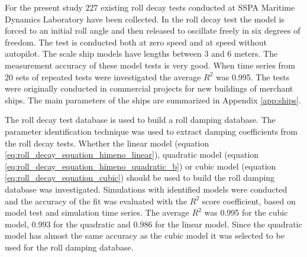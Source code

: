 For the present study 227 existing roll decay tests conducted at SSPA Maritime Dynamics Laboratory have been collected. In the roll decay test the model is forced to an initial roll angle and then released to oscillate freely in six degrees of freedom. The test is conducted both at zero speed and at speed without autopilot. The scale ship models have lengths between 3 and 6 meters. The measurement accuracy of these model tests is very good. When time series from 20 sets of repeated tests were investigated the average $R^2$ was 0.995. The tests were originally conducted in commercial projects for new buildings of merchant ships. The main parameters of the ships are summarized in Appendix \ref{app:ships}. 

The roll decay test database is used to build a roll damping database. The parameter identification technique was used to extract damping coefficients from the roll decay tests. Whether the linear model (equation \ref{eq:roll_decay_equation_himeno_linear}), quadratic model (equation \ref{eq:roll_decay_equation_himeno_quadratic_b}) or cubic model (equation \ref{eq:roll_decay_equation_cubic}) should be used to build the roll damping database was investigated. Simulations with identified models were conducted and the accuracy of the fit was evaluated with the $R^2$ score coefficient, based on model test and simulation time series.
The average $R^2$ was 0.995 for the cubic model, 0.993 for the quadratic and 0.986 for the linear model. Since the quadratic model has almost the same accuracy as the cubic model it was selected to be used for the roll damping database.
